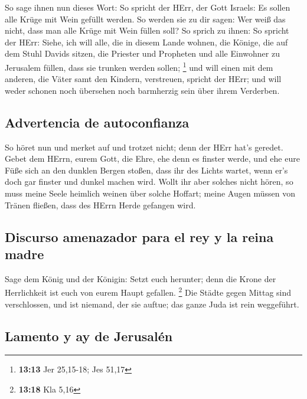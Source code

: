  So sage ihnen nun dieses Wort: So spricht der HErr, der
Gott Israels: Es sollen alle Krüge mit Wein gefüllt werden. So werden
sie zu dir sagen: Wer weiß das nicht, dass man alle Krüge mit Wein
füllen soll?  So sprich zu ihnen: So spricht der HErr:
Siehe, ich will alle, die in diesem Lande wohnen, die Könige, die auf
dem Stuhl Davids sitzen, die Priester und Propheten und alle Einwohner
zu Jerusalem füllen, dass sie trunken werden sollen; \footnote{\textbf{13:13}
  Jer 25,15-18; Jes 51,17}  und will einen mit dem
anderen, die Väter samt den Kindern, verstreuen, spricht der HErr; und
will weder schonen noch übersehen noch barmherzig sein über ihrem
Verderben.

\hypertarget{advertencia-de-autoconfianza}{%
\subsection{Advertencia de
autoconfianza}\label{advertencia-de-autoconfianza}}

 So höret nun und merket auf und trotzet nicht; denn der
HErr hat's geredet.  Gebet dem HErrn, eurem Gott, die
Ehre, ehe denn es finster werde, und ehe eure Füße sich an den dunklen
Bergen stoßen, dass ihr des Lichts wartet, wenn er's doch gar finster
und dunkel machen wird.  Wollt ihr aber solches nicht
hören, so muss meine Seele heimlich weinen über solche Hoffart; meine
Augen müssen von Tränen fließen, dass des HErrn Herde gefangen wird.

\hypertarget{discurso-amenazador-para-el-rey-y-la-reina-madre}{%
\subsection{Discurso amenazador para el rey y la reina
madre}\label{discurso-amenazador-para-el-rey-y-la-reina-madre}}

 Sage dem König und der Königin: Setzt euch herunter;
denn die Krone der Herrlichkeit ist euch von eurem Haupt gefallen.
\footnote{\textbf{13:18} Kla 5,16}  Die Städte gegen
Mittag sind verschlossen, und ist niemand, der sie auftue; das ganze
Juda ist rein weggeführt.

\hypertarget{lamento-y-ay-de-jerusaluxe9n}{%
\subsection{Lamento y ay de
Jerusalén}\label{lamento-y-ay-de-jerusaluxe9n}}

